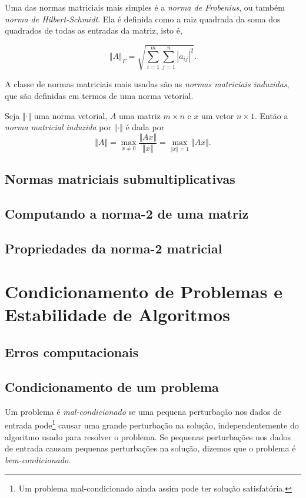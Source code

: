\documentclass{article}
\begin{document}
Uma das normas matriciais mais simples é a \emph{norma de Frobenius}, ou também \emph{norma de Hilbert-Schmidt}. Ela é definida como a raiz quadrada da soma dos quadrados de todas as entradas da matriz, isto é,

\[
    \Vert A \Vert_F = \sqrt{\sum_{i=1}^m \sum_{j=1}^n |a_{ij}|^2}.
\]

A classe de normas matriciais mais usadas são as \emph{normas matriciais induzidas}, que são definidas em termos de uma norma vetorial.

\begin{defn}
    Seja \(\Vert \cdot \Vert\) uma norma vetorial, \(A\) uma matriz \(m \times n\) e \(x\) um vetor \(n \times 1\). Então a \emph{norma matricial induzida} por \(\Vert \cdot \Vert\) é dada por
    \begin{equation}
        \Vert A \Vert = \max_{x \neq 0} \frac{\Vert Ax \Vert}{\Vert x \Vert} = \max_{\Vert x \Vert = 1} \Vert Ax \Vert.
    \end{equation}
\end{defn}

\subsection{Normas matriciais submultiplicativas}
\subsection{Computando a norma-2 de uma matriz}
\subsection{Propriedades da norma-2 matricial}

\section{Condicionamento de Problemas e Estabilidade de Algoritmos}

\subsection{Erros computacionais}
\subsection{Condicionamento de um problema}

\begin{defn}
    Um problema é \emph{mal-condicionado} se uma pequena perturbação nos dados de entrada pode\footnote{Um problema mal-condicionado ainda assim pode ter solução satisfatória.} causar uma grande perturbação na solução, independentemente do algoritmo usado para resolver o problema. Se pequenas perturbações nos dados de entrada causam pequenas perturbações na solução, dizemos que o problema é \emph{bem-condicionado}.
\end{defn}
\end{document}
